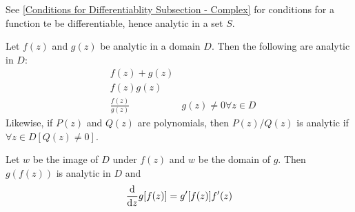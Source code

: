 \documentclass[12pt, english]{book}
\begin{document}
	See \cref{Conditions for Differentiablity Subsection - Complex} for conditions for a function te be differentiable, hence analytic in a set \(S\).
	
	\begin{corollary}
		Let \(f(z)\) and \(g(z)\) be analytic in a domain \(D\). Then the following are analytic in \(D\):
		\begin{align*}
			&f(z)  + g(z) 		& \\
			&f(z)g(z)	 		& \\
			&\frac{f(z)}{g(z)} 	& g(z) \neq 0 \forall z \in D
		\end{align*}
		Likewise, if \(P(z)\) and \(Q(z)\) are polynomials, then \(P(z)/Q(z)\) is analytic if \(\forall z \in D[Q(z) \neq 0]\).
	\end{corollary}

	\begin{corollary}
		Let \(w\) be the image of \(D\) under \(f(z)\) and \(w\) be the domain of \(g\). Then \(g(f(z))\) is analytic in \(D\) and 
		\begin{align*}
			\dv{z} g[f(z)] = g'[f(z)]f'(z)
		\end{align*}
	\end{corollary}
\end{document}
